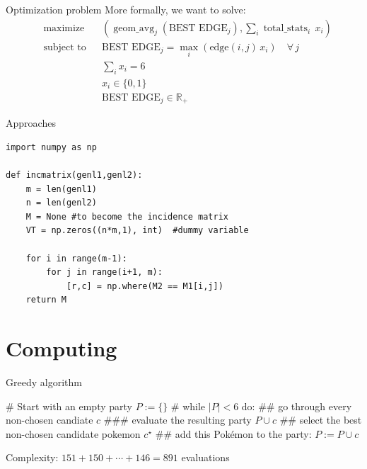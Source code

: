 \documentclass[12pt, aspectratio=149]{beamer}
\theoremstyle{plain}
\begin{document}
\begin{frame}[fragile]{Optimization problem}
	More formally, we want to solve:
	\\
	\begin{align*}
	& \text{maximize}   && 
	\left(
	\operatorname{geom\_avg}_j \left( \text{BEST EDGE}_j \right) ,
	\sum_i \operatorname{total\_stats}_i \, x_i
	\right)
	\\
	& \text{subject to} && \text{BEST EDGE}_j= \max_i \left( \text{edge}(i, j) \, x_i \right) \quad \forall \, j \\
	& && \sum_i x_i = 6    \\
	& && x_{i} \in \{0, 1\}   \\
& && 	\text{BEST EDGE}_j \in \mathbb{R}_+  
	\end{align*}
\end{frame}


\begin{frame}[fragile]{Approaches}
	
\begin{verbatim}
import numpy as np
    
def incmatrix(genl1,genl2):
    m = len(genl1)
    n = len(genl2)
    M = None #to become the incidence matrix
    VT = np.zeros((n*m,1), int)  #dummy variable

    for i in range(m-1):
        for j in range(i+1, m):
            [r,c] = np.where(M2 == M1[i,j])
    return M
\end{verbatim}
\end{frame}


\section{Computing}


\begin{frame}[fragile]{Greedy algorithm}
	
\begin{figure}
	\centering
\end{figure}
	
\begin{easylist}[itemize]
	# Start with an empty party $P := \{\}$
	# while $|P| < 6$ do:
	## go through every non-chosen candiate $c$
	### evaluate the resulting party $P \cup c$
	## select the best non-chosen candidate pokemon $c^\star$
	## add this Pokémon to the party: $P := P \cup c$
\end{easylist}
\vspace*{1em}
Complexity: $151 + 150 + \cdots + 146 = 891$ evaluations
\end{frame}
\end{document}
